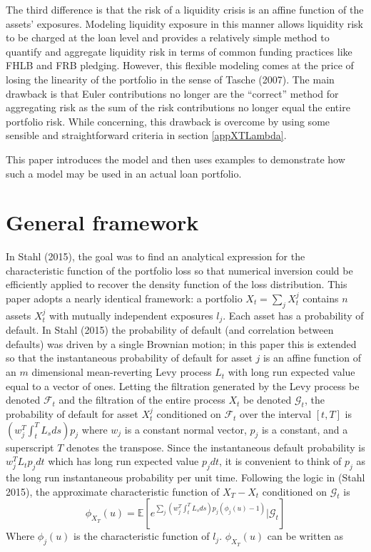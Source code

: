 \documentclass[12pt]{article}
\theoremstyle{definition}
\begin{document}
The third difference is that the risk of a liquidity crisis is an affine function of the assets' exposures.  Modeling liquidity exposure in this manner allows liquidity risk to be charged at the loan level and provides a relatively simple method to quantify and aggregate liquidity risk in terms of common funding practices like FHLB and FRB pledging.  However, this flexible modeling comes at the price of losing the linearity of the portfolio in the sense of Tasche (2007).  The main drawback is that Euler contributions no longer are the ``correct'' method for aggregating risk as the sum of the risk contributions no longer equal the entire portfolio risk.  While concerning, this drawback is overcome by using some sensible and straightforward criteria in section \ref{appXTLambda}.

This paper introduces the model and then uses examples to demonstrate how such a model may be used in an actual loan portfolio.  
\section{General framework}
In Stahl (2015), the goal was to find an analytical expression for the characteristic function of the portfolio loss so that numerical inversion could be efficiently applied to recover the density function of the loss distribution.  This paper adopts a nearly identical framework: a portfolio \(X_t=\sum_j X_t ^ j\) contains \(n\) assets \(X_t ^ j\) with mutually independent exposures \(l_j\).  Each asset has a probability of default.  In Stahl (2015) the probability of default (and correlation between defaults) was driven by a single Brownian motion; in this paper this is extended so that the instantaneous probability of default for asset \(j\) is an affine function of an \(m\) dimensional mean-reverting Levy process \(L_t\) with long run expected value equal to a vector of ones.  Letting the filtration generated by the Levy process be denoted \(\mathcal{F}_t\) and the filtration of the entire process \(X_t\) be denoted \(\mathcal{G}_t\), the probability of default for asset \(X_t ^ j\) conditioned on \(\mathcal{F}_t\) over the interval \([t, T]\) is \(\left(w_j ^ T \int_t ^ T L_s ds  \right) p_j\) where \(w_j\) is a constant normal vector, \(p_j\) is a constant, and a superscript \(T\) denotes the transpose.  Since the instantaneous default probability is \(w_j ^T L_t p_j dt\) which has long run expected value \(p_j dt\),  it is convenient to think of \(p_j\) as the long run instantaneous probability per unit time.  Following the logic in (Stahl 2015), the approximate characteristic function of \(X_T-X_t\) conditioned on \(\mathcal{G}_t\) is 
\begin{equation}
\phi_{X_T}(u)=\mathbb{E}\left[e^{\sum_j \left(w_j ^T \int_t ^ T L_s  ds \right) p_j (\phi_j(u)-1)} |\mathcal{G}_t\right]
\end{equation}
Where \(\phi_j(u)\) is the characteristic function of \(l_j\).  \(\phi_{X_T}(u)\) can be written as 
\end{document}
